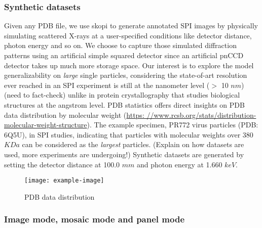 \subsubsection{Synthetic datasets}

Given any PDB file, we use skopi \cite{peckSkopiSimulationPackage2021} to
generate annotated SPI images by physically simulating scattered X-rays at a
user-specified conditions like detector distance, photon energy and so on.  We
choose to capture those simulated diffraction patterns using an artificial
simple squared detector since an artificial pnCCD detector takes up much more
storage space.  Our interest is to explore the model generalizability on
\textit{large} single particles, considering the state-of-art resolution ever
reached in an SPI experiment is still at the nanometer level ($>$ 10 $nm$)
{\color{red} (need to fact-check)} unlike in protein crystallography that
studies biological structures at the angstrom level. PDB statistics offers
direct insights on PDB data distribution by molecular weight (\url{https:
//www.rcsb.org/stats/distribution-molecular-weight-structure}).  The
example specimen, PR772 virus particles (PDB: 6Q5U),  in SPI studies, indicating that
particles with molecular weights over 380 $KDa$ can be considered as the
\textit{largest} particles.  {\color{red}(Explain on how datasets are used, more
experiments are undergoing!)} Synthetic datasets are generated by setting the
detector distance at 100.0 $mm$ and photon energy at 1.660 $keV$.  

\begin{figure}
\centering
\texttt{[image: example-image]}
\caption{PDB data distribution}
\label{fig:pdb_data_distribution}
\end{figure}


\subsubsection{Image mode, mosaic mode and panel mode}

